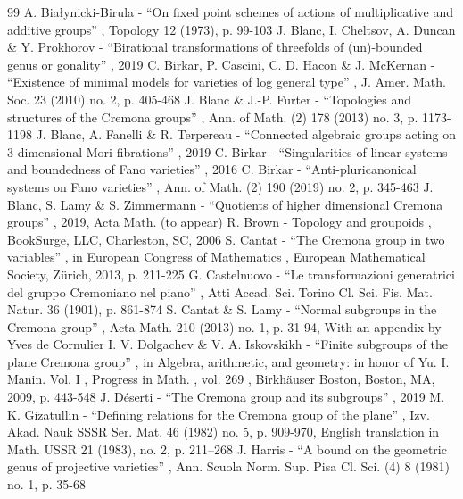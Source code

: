 \documentclass[11pt]{article}
\numberwithin{equation}{section}
\theoremstyle{plain}
\theoremstyle{definition}
\begin{document}
\vspace*{\baselineskip}


\begin{thebibliography}{99}
 A. Białynicki-Birula - “On fixed point schemes of actions of multiplicative and additive groups” , Topology 12 (1973), p. 99-103
 J. Blanc, I. Cheltsov, A. Duncan \& Y. Prokhorov - “Birational transformations of threefolds of (un)-bounded genus or gonality” , 2019
 C. Birkar, P. Cascini, C. D. Hacon \& J. McKernan - “Existence of minimal models for varieties of log general type” , J. Amer. Math. Soc. 23 (2010) no. 2, p. 405-468
 J. Blanc \& J.-P. Furter - “Topologies and structures of the Cremona groups” , Ann. of Math. (2) 178 (2013) no. 3, p. 1173-1198
 J. Blanc, A. Fanelli \& R. Terpereau - “Connected algebraic groups acting on $3$-dimensional Mori fibrations” , 2019
 C. Birkar - “Singularities of linear systems and boundedness of Fano varieties” , 2016
 C. Birkar - “Anti-pluricanonical systems on Fano varieties” , Ann. of Math. (2) 190 (2019) no. 2, p. 345-463
 J. Blanc, S. Lamy \& S. Zimmermann - “Quotients of higher dimensional Cremona groups” , 2019, Acta Math. (to appear)
 R. Brown - Topology and groupoids , BookSurge, LLC, Charleston, SC, 2006
 S. Cantat - “The Cremona group in two variables” , in European Congress of Mathematics , European Mathematical Society, Zürich, 2013, p. 211-225
 G. Castelnuovo - “Le transformazioni generatrici del gruppo Cremoniano nel piano” , Atti Accad. Sci. Torino Cl. Sci. Fis. Mat. Natur. 36 (1901), p. 861-874
 S. Cantat \& S. Lamy - “Normal subgroups in the Cremona group” , Acta Math. 210 (2013) no. 1, p. 31-94, With an appendix by Yves de Cornulier
 I. V. Dolgachev \& V. A. Iskovskikh - “Finite subgroups of the plane Cremona group” , in Algebra, arithmetic, and geometry: in honor of Yu. I. Manin. Vol. I , Progress in Math. , vol. 269 , Birkhäuser Boston, Boston, MA, 2009, p. 443-548
 J. Déserti - “The Cremona group and its subgroups” , 2019
 M. K. Gizatullin - “Defining relations for the Cremona group of the plane” , Izv. Akad. Nauk SSSR Ser. Mat. 46 (1982) no. 5, p. 909-970, English translation in Math. USSR 21 (1983), no. 2, p. 211–268
 J. Harris - “A bound on the geometric genus of projective varieties” , Ann. Scuola Norm. Sup. Pisa Cl. Sci. (4) 8 (1981) no. 1, p. 35-68

\end{thebibliography}
\end{document}

